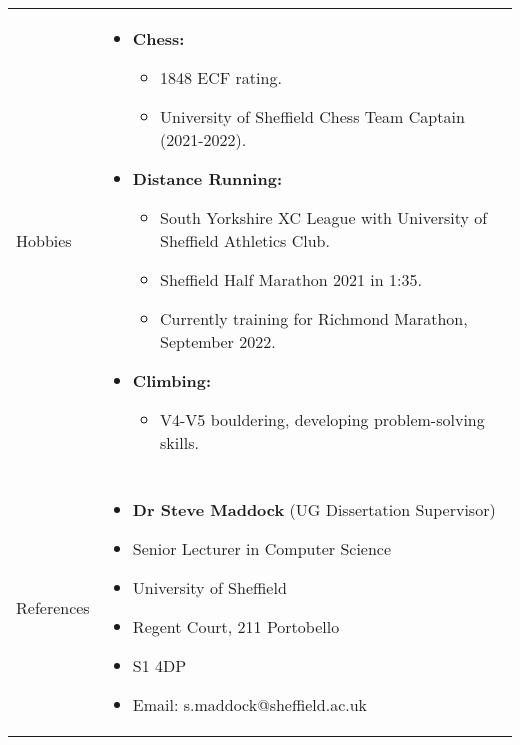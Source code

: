 \documentclass[11pt]{article}
\begin{document}
\begin{minipage}[t][0pt]{\linewidth}
\begin{tabular}[t]{p{2cm} p{14cm}}
		
	    {Hobbies} &
        \begin{itemize}
            \renewcommand{\labelitemi}{$\diamond$}
            \item \textbf{Chess:}
				\begin{itemize}
					\renewcommand{\labelitemii}{$\cdot$}
					\item 1848 ECF rating.
					\item University of Sheffield Chess Team Captain (2021-2022).
				\end{itemize}
            \item \textbf{Distance Running:} 
				\begin{itemize}
					\renewcommand{\labelitemii}{$\cdot$}
					\item South Yorkshire XC League with University of Sheffield Athletics Club.
					\item Sheffield Half Marathon 2021 in 1:35.
					\item Currently training for Richmond Marathon, September 2022.
				\end{itemize}
            \item \textbf{Climbing:} 
				\begin{itemize}
					\renewcommand{\labelitemii}{$\cdot$}
					\item V4-V5 bouldering, developing problem-solving skills.
				\end{itemize}
        \end{itemize} \\
		\\

	{References} &
	    \begin{itemize}[label={}]
	        \item \textbf{Dr Steve Maddock} (UG Dissertation Supervisor)
        	\item Senior Lecturer in Computer Science
            \item University of Sheffield
            \item Regent Court, 211 Portobello
            \item S1 4DP
        	\item Email: s.maddock@sheffield.ac.uk 
	    \end{itemize}
    \end{tabular}
\end{minipage}
\end{document}

